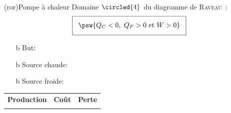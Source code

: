 \documentclass[../../main/main.tex]{subfiles}
\begin{document}
\begin{tcb*}[sidebyside](ror){Pompe à chaleur}
	Domaine $\circled{4}$ du diagramme de \textsc{Raveau}~:
	\begin{gather*}
		\setlength{\fboxsep}{3mm}
		\boxed{\psw{Q_C < 0,~Q_F > 0 \text{~et~} W > 0}}
	\end{gather*}
	\begin{itemize}
    \item[b]{But}: 
    \item[b]{\color{red}Source chaude}: 
    \item[b]{\color{blue}Source froide}: 
	\end{itemize}
  \begin{tabularx}{\linewidth}{YYY}
    \textbf{Production} &
    \textbf{Coût} &
    \textbf{Perte}
    \\
     &
     &
  \end{tabularx}
	\tcblower
	\begin{center}
		\vspace{-15pt}
	\end{center}
\end{tcb*}
\end{document}
